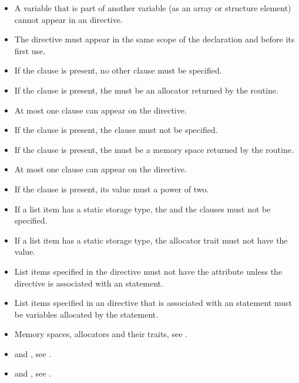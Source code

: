 \restrictions
\begin{itemize}
\item A variable that is part of another variable (as an array or structure element) cannot appear in an  directive.
\item The directive must appear in the same scope of the  declaration and before its first use.
\item If the  clause is present, no other clause must be specified.
\item If the  clause is present, the  must be an allocator returned by the  routine.
\item At most one  clause can appear on the  directive.
\item If the  clause is present, the   clause must not be specified.
\item If the  clause is present, the  must be a memory space returned by the  routine.
\item At most one  clause can appear on the  directive.
\item If the  clause is present, its value must a power of two.
\ccppspecificstart
\item If a list item has a static storage type, the  and the  clauses must not be specified.
\item If a list item has a static storage type, the  allocator trait must not have the  value.
\ccppspecificend
\fortranspecificstart
\item List items specified in the  directive must not have the  attribute unless the directive is associated with an  statement.
\item List items specified in an  directive that is associated with an  statement must be  variables allocated by the  statement.
\fortranspecificend
\end{itemize}

\crossreferences
\begin{itemize}
\item Memory spaces, allocators and their traits, see .
\ccppspecificstart
\item {} and , see .
\ccppspecificend
\fortranspecificstart
\item {} and , see .
\fortranspecificend
\end{itemize}


